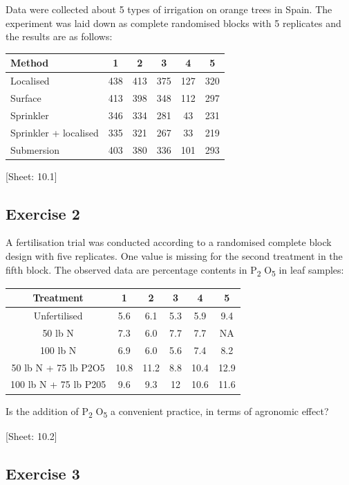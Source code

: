 \documentclass[a4paper,12pt,oneside]{book}
\begin{document}
Data were collected about 5 types of irrigation on orange trees in Spain. The experiment was laid down as complete randomised blocks with 5 replicates and the results are as follows:

\begin{longtable}[]{@{}lccccc@{}}
\toprule\noalign{}
Method & 1 & 2 & 3 & 4 & 5 \\
\midrule\noalign{}
\endhead
\bottomrule\noalign{}
\endlastfoot
Localised & 438 & 413 & 375 & 127 & 320 \\
Surface & 413 & 398 & 348 & 112 & 297 \\
Sprinkler & 346 & 334 & 281 & 43 & 231 \\
Sprinkler + localised & 335 & 321 & 267 & 33 & 219 \\
Submersion & 403 & 380 & 336 & 101 & 293 \\
\end{longtable}

{[}Sheet: 10.1{]}

\hypertarget{exercise-2-6}{%
\subsection{Exercise 2}\label{exercise-2-6}}

A fertilisation trial was conducted according to a randomised complete block design with five replicates. One value is missing for the second treatment in the fifth block. The observed data are percentage contents in P\textsubscript{2} O\textsubscript{5} in leaf samples:

\begin{longtable}[]{@{}cccccc@{}}
\toprule\noalign{}
Treatment & 1 & 2 & 3 & 4 & 5 \\
\midrule\noalign{}
\endhead
\bottomrule\noalign{}
\endlastfoot
Unfertilised & 5.6 & 6.1 & 5.3 & 5.9 & 9.4 \\
50 lb N & 7.3 & 6.0 & 7.7 & 7.7 & NA \\
100 lb N & 6.9 & 6.0 & 5.6 & 7.4 & 8.2 \\
50 lb N + 75 lb P2O5 & 10.8 & 11.2 & 8.8 & 10.4 & 12.9 \\
100 lb N + 75 lb P205 & 9.6 & 9.3 & 12 & 10.6 & 11.6 \\
\end{longtable}

Is the addition of P\textsubscript{2} O\textsubscript{5} a convenient practice, in terms of agronomic effect?

{[}Sheet: 10.2{]}

\hypertarget{exercise-3-6}{%
\subsection{Exercise 3}\label{exercise-3-6}}
\end{document}
